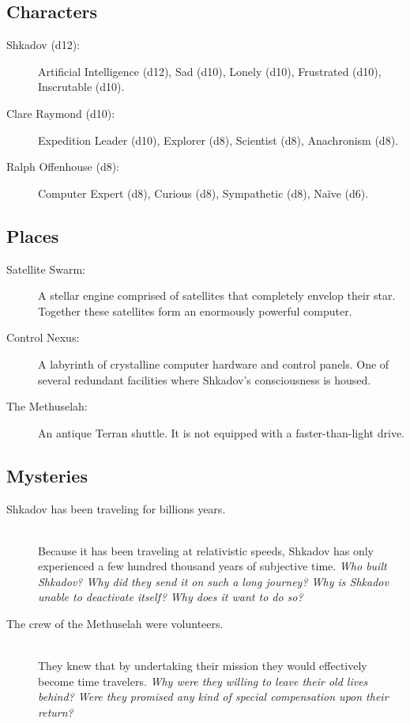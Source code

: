 \documentclass[11pt, a5paper, parskip=half-, DIV=12]{scrartcl}
\begin{document}
\newpage

\subsection*{Characters}
\begin{description}
	\item[Shkadov (d12):] Artificial Intelligence (d12), Sad (d10), Lonely (d10),  Frustrated (d10), Inscrutable (d10).
	\item[Clare Raymond (d10):]  Expedition Leader (d10), Explorer (d8), Scientist (d8), Anachronism (d8).
	\item[Ralph Offenhouse (d8):] Computer Expert (d8), Curious (d8), Sympathetic (d8), Na\"{i}ve (d6).
\end{description}

\subsection*{Places}
\begin{description}
	\item[Satellite Swarm:] A stellar engine comprised of satellites that completely envelop their star. Together these satellites form an enormously powerful computer.
	\item[Control Nexus:] A labyrinth of crystalline computer hardware and control panels. One of several redundant facilities where Shkadov's consciousness is housed. 
	\item[The Methuselah:] An antique Terran shuttle. It is not equipped with a faster-than-light drive.
\end{description}

\subsection*{Mysteries}
\begin{description}
	\item[Shkadov has been traveling for billions years.] \phantom{a} \\ Because it has been traveling at relativistic speeds, Shkadov has only experienced a few hundred thousand years of subjective time. \textit{Who built Shkadov? Why did they send it on such a long journey? Why is Shkadov unable to deactivate itself? Why does it want to do so?}
	\item[The crew of the Methuselah were volunteers.] \phantom{a} \\ They knew that by undertaking their mission they would effectively become time travelers. \textit{Why were they willing to leave their old lives behind? Were they promised any kind of special compensation upon their return?}
\end{description}
\end{document}

